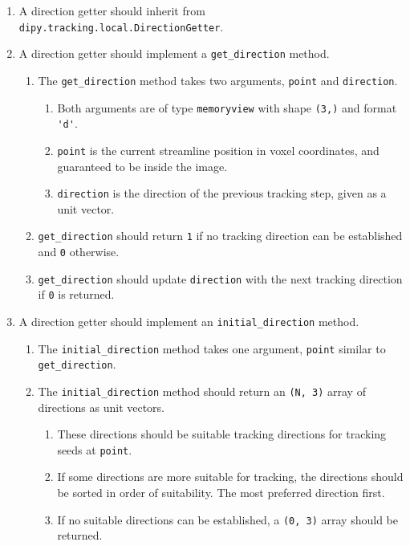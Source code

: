 \begin{enumerate}
\item A direction getter should inherit from \verb|dipy.tracking.local.DirectionGetter|.
\item A direction getter should implement a \verb|get_direction| method.
\begin{enumerate}
\item The \verb|get_direction| method takes two arguments, \verb|point| and \verb|direction|.
\begin{enumerate}
\item Both arguments are of type \verb|memoryview| with shape \verb|(3,)| and format \verb|'d'|.
\item \verb|point| is the current streamline position in voxel coordinates, and guaranteed to be inside the image.
\item \verb|direction| is the direction of the previous tracking step, given as a unit vector.
\end{enumerate}
\item \verb|get_direction| should return \verb|1| if no tracking direction can be established and \verb|0| otherwise.
\item \verb|get_direction| should update \verb|direction| with the next tracking direction if \verb|0| is returned.
\end{enumerate}
\item A direction getter should implement an \verb|initial_direction| method.
\begin{enumerate}
\item The \verb|initial_direction| method takes one argument, \verb|point| similar to \verb|get_direction|.
\item The \verb|initial_direction| method should return an \verb|(N, 3)| array of directions as unit vectors.
\begin{enumerate}
\item These directions should be suitable tracking directions for tracking seeds at \verb|point|.
\item If some directions are more suitable for tracking, the directions should be sorted in order of suitability. The most preferred direction first.  
\item If no suitable directions can be established, a \verb|(0, 3)| array should be returned.
\end{enumerate}
\end{enumerate}
\end{enumerate}
